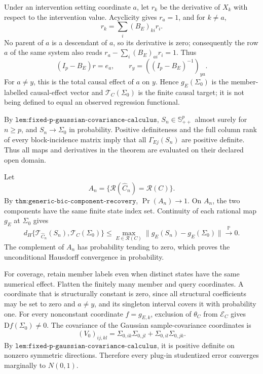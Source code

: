 Under an intervention setting coordinate \(a\), let \(r_k\) be the derivative of \(X_k\) with respect to the intervention value. Acyclicity gives \(r_a=1\), and for \(k\neq a\),
\[
 r_k=\sum_i(B_E)_{ki}r_i.
\]
No parent of \(a\) is a descendant of \(a\), so its derivative is zero; consequently the row \(a\) of the same system also reads \(r_a-\sum_i(B_E)_{ai}r_i=1\). Thus
\[
 (I_p-B_E)r=e_a,
 \qquad
 r_y=((I_p-B_E)^{-1})_{ya}.
\]
For \(a\neq y\), this is the total causal effect of \(a\) on \(y\). Hence \(g_E(\Sigma_0)\) is the member-labelled causal-effect vector and \(\mathcal T_C(\Sigma_0)\) is the finite causal target; it is not being defined to equal an observed regression functional.

By \(\texttt{lem:fixed-p-gaussian-covariance-calculus}\), \(S_n\in\mathbb S^p_{++}\) almost surely for \(n\geq p\), and \(S_n\to\Sigma_0\) in probability. Positive definiteness and the full column rank of every block-incidence matrix imply that all \(\Gamma_{Ej}(S_n)\) are positive definite. Thus all maps and derivatives in the theorem are evaluated on their declared open domain.

Let
\[
 A_n=\{\mathcal R(\widehat C_n)=\mathcal R(C)\}.
\]
By \(\texttt{thm:generic-bic-component-recovery}\), \(\Pr(A_n)\to1\). On \(A_n\), the two components have the same finite state index set. Continuity of each rational map \(g_E\) at \(\Sigma_0\) gives
\[
 d_H\{\mathcal T_{\widehat C_n}(S_n),\mathcal T_C(\Sigma_0)\}
 \leq\max_{E\in\mathcal R(C)}
 \|g_E(S_n)-g_E(\Sigma_0)\|
 \xrightarrow{\mathbb P}0.
\]
The complement of \(A_n\) has probability tending to zero, which proves the unconditional Hausdorff convergence in probability.

For coverage, retain member labels even when distinct states have the same numerical effect. Flatten the finitely many member and query coordinates. A coordinate that is structurally constant is zero, since all structural coefficients may be set to zero and \(a\neq y\), and its singleton interval covers it with probability one. For every nonconstant coordinate \(f=g_{E,k}\), exclusion of \(\theta_C\) from \(\mathcal E_C\) gives \(\mathrm Df(\Sigma_0)\neq0\). The covariance of the Gaussian sample-covariance coordinates is
\[
 (V_0)_{ij,kl}
 =\Sigma_{0,ik}\Sigma_{0,jl}+\Sigma_{0,il}\Sigma_{0,jk}.
\]
By \(\texttt{lem:fixed-p-gaussian-covariance-calculus}\), it is positive definite on nonzero symmetric directions. Therefore every plug-in studentized error converges marginally to \(N(0,1)\).

